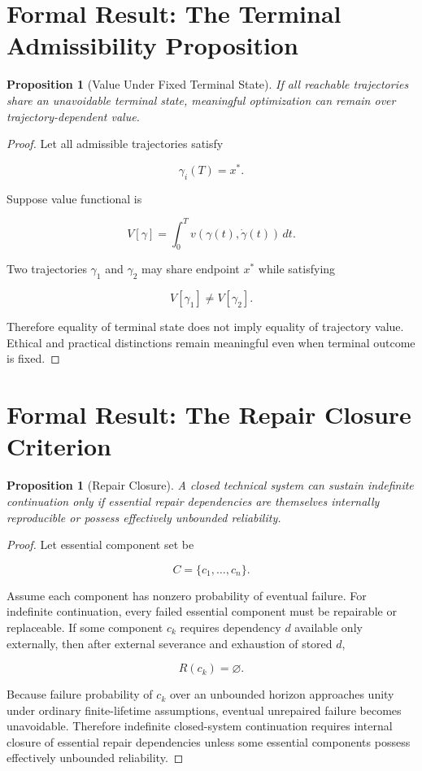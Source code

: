 \documentclass[11pt,oneside]{book}
\newtheorem{proposition}[theorem]{Proposition}
\theoremstyle{definition}
\theoremstyle{remark}
\begin{document}
\section{Formal Result: The Terminal Admissibility Proposition}

\begin{proposition}[Value Under Fixed Terminal State] If all reachable trajectories share an
unavoidable terminal state, meaningful optimization can remain over trajectory-dependent value.
\end{proposition} \begin{proof} Let all admissible trajectories satisfy

\[
\gamma_i(T)=x^\ast.
\]

Suppose value functional is

\[
V[\gamma] = \int_0^T v(\gamma(t),\dot{\gamma}(t))\,dt.
\]

Two trajectories \(\gamma_1\) and \(\gamma_2\) may share endpoint \(x^\ast\) while satisfying

\[
V[\gamma_1]\neq V[\gamma_2].
\]

Therefore equality of terminal state does not imply equality of trajectory value. Ethical and
practical distinctions remain meaningful even when terminal outcome is fixed. \end{proof}

\section{Formal Result: The Repair Closure Criterion}

\begin{proposition}[Repair Closure] A closed technical system can sustain indefinite continuation
only if essential repair dependencies are themselves internally reproducible or possess effectively
unbounded reliability. \end{proposition} \begin{proof} Let essential component set be

\[
C=\{c_1,\ldots,c_n\}.
\]

Assume each component has nonzero probability of eventual failure. For indefinite continuation,
every failed essential component must be repairable or replaceable. If some component \(c_k\)
requires dependency \(d\) available only externally, then after external severance and exhaustion of
stored \(d\),

\[
R(c_k)=\varnothing.
\]

Because failure probability of \(c_k\) over an unbounded horizon approaches unity under ordinary
finite-lifetime assumptions, eventual unrepaired failure becomes unavoidable. Therefore indefinite
closed-system continuation requires internal closure of essential repair dependencies unless some
essential components possess effectively unbounded reliability. \end{proof}
\end{document}
